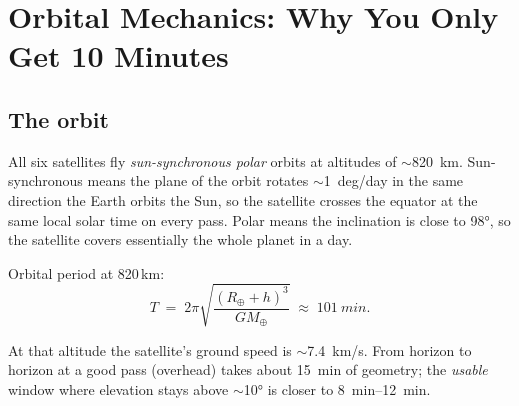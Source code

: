 \documentclass[11pt,a4paper]{article}
\begin{document}
\begin{center}
\end{center}

\section{Orbital Mechanics: Why You Only Get 10 Minutes}

\subsection{The orbit}

All six satellites fly \emph{sun-synchronous polar} orbits at
altitudes of \(\sim\)\SI{820}{km}.  Sun-synchronous means the plane
of the orbit rotates \(\sim\)\SI{1}{deg/day} in the same direction
the Earth orbits the Sun, so the satellite crosses the equator at
the same local solar time on every pass.  Polar means the
inclination is close to 98°, so the satellite covers essentially the
whole planet in a day.

Orbital period at 820\,km:
\begin{equation}
T \;=\; 2\pi \sqrt{\frac{(R_\oplus + h)^3}{G M_\oplus}}
\;\approx\; \SI{101}{min}.
\end{equation}

At that altitude the satellite's ground speed is
\(\sim\)\SI{7.4}{km/s}.  From horizon to horizon at a good pass
(overhead) takes about \SI{15}{min} of geometry; the \emph{usable}
window where elevation stays above \(\sim\)10° is closer to
\SI{8}{min}--\SI{12}{min}.
\end{document}
